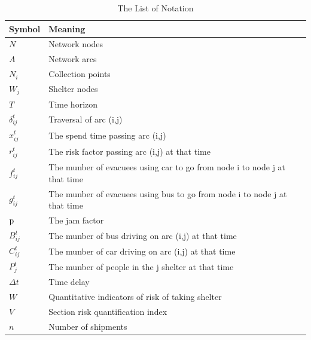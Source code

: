 \documentclass{mcmthesis}
\begin{document}
\begin{center}
\begin{longtable}{p{}p{}m{}}
\caption{The List of Notation}\\
\hline
Symbol& Meaning \\
\hline

$N$      & Network nodes
                                                         \\
$A$      & Network arcs
                                                          \\
$N_i$     & Collection points
                                                        \\
$W_j$       & Shelter nodes                                                            \\
$T$      & Time horizon                                                            \\
$\delta _{ij}^t$       & Traversal of arc (i,j)                                  \\
$x_{ij}^t$       & The spend time passing arc (i,j)                                         \\
$r_{ij}^t$       & The risk factor passing arc (i,j) at that time                            \\
$f_{ij}^t$       & The munber of evacuees using car to go from node i to node j at that time \\
$g_{ij}^t$       & The munber of evacuees using bus to go from node i to node j at that time \\
$\rm{p}$      & The jam factor                                                            \\
$B_{ij}^t$       & The munber of bus driving on arc (i,j) at that time                      \\
$C_{ij}^t$       & The munber of car driving on arc (i,j) at that time                      \\
$P_j^t$       & The munber of people in the j shelter at that time                       \\
$\Delta t$       & Time delay                                                                \\
$W$       & Quantitative indicators of risk of taking shelter                         \\
$V$       & Section risk quantification index                                         \\
$n$       & Number of shipments                                                     \\

\end{longtable}
\end{center}
\end{document}
